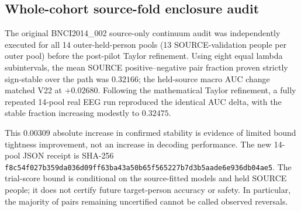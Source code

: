 \subsection{Whole-cohort source-fold enclosure audit}
\label{sec:v23-full-taylor}
The original BNCI2014\_002 source-only continuum audit
was independently executed for all 14 outer-held-person
pools (13 SOURCE-validation people per outer pool) before
the post-pilot Taylor refinement. Using eight equal
lambda subintervals, the mean SOURCE positive--negative
pair fraction proven strictly sign-stable over the path
was $0.32166$; the held-source macro AUC change matched
V22 at $+0.02680$. Following the mathematical Taylor
refinement, a fully repeated 14-pool real EEG run
reproduced the identical AUC delta, with the stable
fraction increasing modestly to $0.32475$.

This $0.00309$ absolute increase in confirmed stability
is evidence of limited bound tightness improvement,
not an increase in decoding performance. The new
14-pool JSON receipt is SHA-256
\texttt{f8c54f027b359da036d09ff63ba43a50b65f565227b7d3b5aade6e936db04ae5}.
The trial-score bound is conditional on the source-fitted
models and held SOURCE people; it does not certify
future target-person accuracy or safety. In particular,
the majority of pairs remaining uncertified cannot be
called observed reversals.
